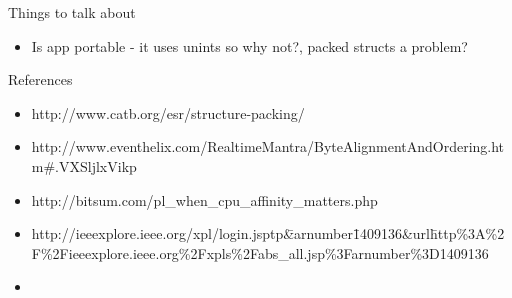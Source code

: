 \documentclass[a4paper, titlepage]{article}
\begin{document}

\listoftodos

\newpage

Things to talk about

\begin{itemize}
	\item Is app portable - it uses unints so why not?, packed structs a problem?
\end{itemize}

References

\begin{itemize}
	\item http://www.catb.org/esr/structure-packing/
	\item http://www.eventhelix.com/RealtimeMantra/ByteAlignmentAndOrdering.htm\#.VXSljlxVikp
	\item http://bitsum.com/pl\_when\_cpu\_affinity\_matters.php
	\item http://ieeexplore.ieee.org/xpl/login.jsp\?tp\=\&arnumber\=1409136\&url\=http\%3A\%2F\%2Fieeexplore.ieee.org\%2Fxpls\%2Fabs\_all.jsp\%3Farnumber\%3D1409136
	\item
\end{itemize}

\newpage


\newpage

\newpage

\newpage
\tableofcontents
\newpage

\newpage

\newpage

\newpage

\newpage

\newpage

\newpage

%
%

\newpage

\end{document}
